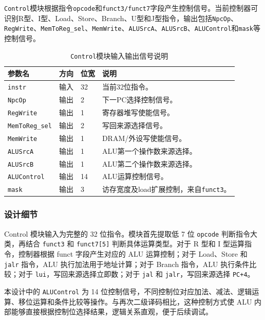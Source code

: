 \documentclass[UTF8,a4paper,12pt]{ctexart}
\newcommand{\code}[1]{\texttt{#1}}
\begin{document}
\code{Control}模块根据指令\code{opcode}和\code{funct3/funct7}字段产生控制信号。当前控制器可识别R型、I型、Load、Store、Branch、U型和J型指令，输出包括\code{NpcOp}、\code{RegWrite}、\code{MemToReg\_sel}、\code{MemWrite}、\code{ALUSrcA}、\code{ALUSrcB}、\code{ALUControl}和\code{mask}等控制信号。

\begin{table}[H]
\centering
\caption{\code{Control}模块输入输出信号说明}
\footnotesize
\renewcommand{\arraystretch}{1.15}
\begin{tabularx}{\textwidth}{p{3.2cm}p{1.5cm}p{2.1cm}X}
\toprule
参数名 & 方向 & 位宽 & 说明 \\
\midrule
\code{instr} & 输入 & 32 & 当前32位指令。 \\
\code{NpcOp} & 输出 & 2 & 下一PC选择控制信号。 \\
\code{RegWrite} & 输出 & 1 & 寄存器堆写使能信号。 \\
\code{MemToReg\_sel} & 输出 & 2 & 写回来源选择信号。 \\
\code{MemWrite} & 输出 & 1 & DRAM/外设写使能信号。 \\
\code{ALUSrcA} & 输出 & 1 & ALU第一个操作数来源选择。 \\
\code{ALUSrcB} & 输出 & 1 & ALU第二个操作数来源选择。 \\
\code{ALUControl} & 输出 & 14 & ALU运算控制信号。 \\
\code{mask} & 输出 & 3 & 访存宽度及load扩展控制，来自\code{funct3}。 \\
\bottomrule
\end{tabularx}
\end{table}

\subsubsection*{设计细节}

Control 模块输入为完整的 32 位指令。模块首先提取低 7 位 \code{opcode} 判断指令大类，再结合 \code{funct3} 和 \code{funct7[5]} 判断具体运算类型。对于 R 型和 I 型运算指令，控制器根据 funct 字段产生对应的 ALU 运算控制；对于 Load、Store 和 \code{jalr} 指令，ALU 执行加法用于地址计算；对于 Branch 指令，ALU 执行条件比较；对于 \code{lui}，写回来源选择立即数；对于 \code{jal} 和 \code{jalr}，写回来源选择 \code{PC+4}。

本设计中的 \code{ALUControl} 为 14 位控制信号，不同控制位对应加法、减法、逻辑运算、移位运算和条件比较等操作。与再次二级译码相比，这种控制方式使 ALU 内部能够直接根据控制位选择结果，逻辑关系直观，便于后续调试。
\end{document}
